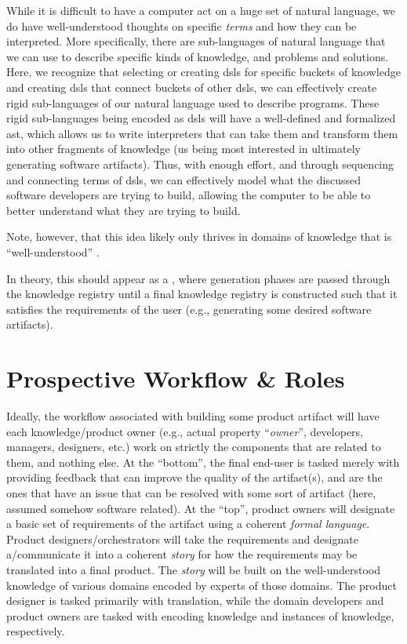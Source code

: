 While it is difficult to have a computer act on a huge set of natural language,
we do have well-understood thoughts on specific \textit{terms} and how they can
be interpreted. More specifically, there are sub-languages of natural language
that we can use to describe specific kinds of knowledge, and problems and
solutions. Here, we recognize that selecting or creating \aclp{dsl} for specific
buckets of knowledge and creating \aclp{dsl} that connect buckets of other
\aclp{dsl}, we can effectively create rigid sub-languages of our natural
language used to describe programs. These rigid sub-languages being encoded as
\aclp{dsl} will have a well-defined and formalized \acs{ast}, which allows us to
write interpreters that can take them and transform them into other fragments of
knowledge (us being most interested in ultimately generating software
artifacts). Thus, with enough effort, and through sequencing and connecting
terms of \aclp{dsl}, we can effectively model what the discussed software
developers are trying to build, allowing the computer to be able to better
understand what they are trying to build.

Note, however, that this idea likely only thrives in domains of knowledge that
is ``well-understood'' \cite{well-understood}.

In theory, this should appear as a , where generation phases are passed
through the knowledge registry until a final knowledge registry is constructed
such that it satisfies the requirements of the user (e.g., generating some
desired software artifacts).

\section{Prospective Workflow \& Roles}
\label{sec:idlgy:prospective_workflow}

Ideally, the workflow associated with building some product artifact will have
each knowledge/product owner (e.g., actual property ``\textit{owner}'',
developers, managers, designers, etc.) work on strictly the components that are
related to them, and nothing else. At the ``bottom'', the final end-user is
tasked merely with providing feedback that can improve the quality of the
artifact(s), and are the ones that have an issue that can be resolved with some
sort of artifact (here, assumed somehow software related). At the ``top'',
product owners will designate a basic set of requirements of the artifact using
a coherent \textit{formal language}. Product designers/orchestrators will take
the requirements and designate a/communicate it into a coherent \textit{story}
for how the requirements may be translated into a final product. The
\textit{story} will be built on the well-understood knowledge of various domains
encoded by experts of those domains. The product designer is tasked primarily
with translation, while the domain developers and product owners are tasked with
encoding knowledge and instances of knowledge, respectively.

